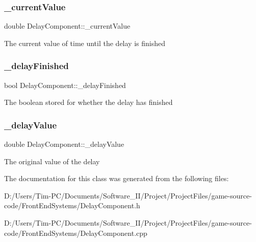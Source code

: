 \subsubsection{\texorpdfstring{\+\_\+current\+Value}{\_currentValue}}
{\footnotesize\ttfamily double Delay\+Component\+::\+\_\+current\+Value\hspace{0.3cm}{\ttfamily [private]}}

The current value of time until the delay is finished \mbox{\label{class_delay_component_a821cd453973fced990ae204967e011ff}} 
\subsubsection{\texorpdfstring{\+\_\+delay\+Finished}{\_delayFinished}}
{\footnotesize\ttfamily bool Delay\+Component\+::\+\_\+delay\+Finished\hspace{0.3cm}{\ttfamily [private]}}

The boolean stored for whether the delay has finished \mbox{\label{class_delay_component_a36f26c01438d1c0347d06888d3b841ac}} 
\subsubsection{\texorpdfstring{\+\_\+delay\+Value}{\_delayValue}}
{\footnotesize\ttfamily double Delay\+Component\+::\+\_\+delay\+Value\hspace{0.3cm}{\ttfamily [private]}}

The original value of the delay 

The documentation for this class was generated from the following files\+:\begin{DoxyCompactItemize}
\item 
D\+:/\+Users/\+Tim-\/\+P\+C/\+Documents/\+Software\+\_\+\+I\+I/\+Project/\+Project\+Files/game-\/source-\/code/\+Front\+End\+Systems/Delay\+Component.\+h\item 
D\+:/\+Users/\+Tim-\/\+P\+C/\+Documents/\+Software\+\_\+\+I\+I/\+Project/\+Project\+Files/game-\/source-\/code/\+Front\+End\+Systems/Delay\+Component.\+cpp\end{DoxyCompactItemize}
